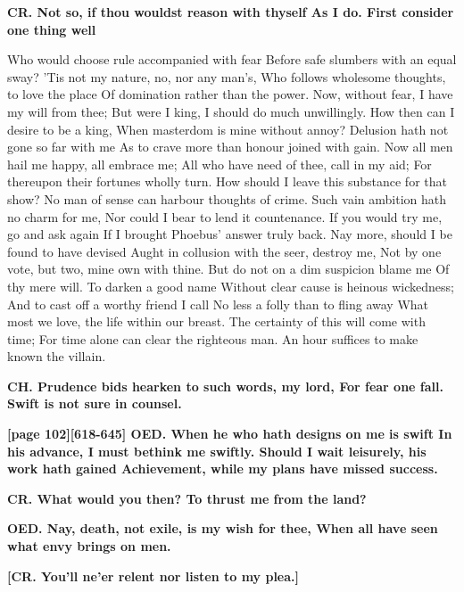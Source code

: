 \documentclass[11pt,letter]{book}
\begin{document}
\par \textbf{CR. Not so, if thou wouldst reason with thyself As I do. First consider one thing well}
\par   Who would choose rule accompanied with fear Before safe slumbers with an equal sway? ’Tis not my nature, no, nor any man’s, Who follows wholesome thoughts, to love the place Of domination rather than the power. Now, without fear, I have my will from thee; But were I king, I should do much unwillingly. How then can I desire to be a king, When masterdom is mine without annoy? Delusion hath not gone so far with me As to crave more than honour joined with gain. Now all men hail me happy, all embrace me; All who have need of thee, call in my aid; For thereupon their fortunes wholly turn. How should I leave this substance for that show? No man of sense can harbour thoughts of crime. Such vain ambition hath no charm for me, Nor could I bear to lend it countenance. If you would try me, go and ask again If I brought Phoebus’ answer truly back. Nay more, should I be found to have devised Aught in collusion with the seer, destroy me, Not by one vote, but two, mine own with thine. But do not on a dim suspicion blame me Of thy mere will. To darken a good name Without clear cause is heinous wickedness; And to cast off a worthy friend I call No less a folly than to fling away What most we love, the life within our breast. The certainty of this will come with time; For time alone can clear the righteous man. An hour suffices to make known the villain.

\par \textbf{CH. Prudence bids hearken to such words, my lord, For fear one fall. Swift is not sure in counsel.}
\par 

\par \textbf{[page 102][618-645] OED. When he who hath designs on me is swift In his advance, I must bethink me swiftly. Should I wait leisurely, his work hath gained Achievement, while my plans have missed success.}
\par 

\par \textbf{CR. What would you then? To thrust me from the land?}
\par 

\par \textbf{OED. Nay, death, not exile, is my wish for thee, When all have seen what envy brings on men.}
\par 

\par \textbf{[CR. You’ll ne’er relent nor listen to my plea.]}
\par 
\end{document}
